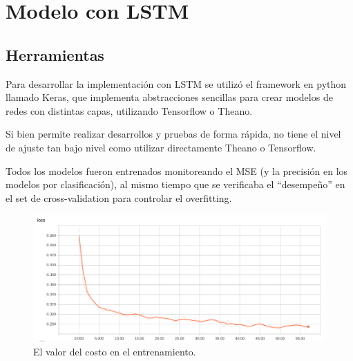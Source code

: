 
\chapter{Modelo con LSTM} %

\label{LSTM} %


\section{Herramientas}

Para desarrollar la implementaci\'on con LSTM se utiliz\'o el framework en python llamado Keras, que
implementa abstracciones sencillas para crear modelos de redes con distintas capas, utilizando
Tensorflow o Theano.

Si bien permite realizar desarrollos y pruebas de forma r\'apida, no tiene el nivel de ajuste tan
bajo nivel como utilizar directamente Theano o Tensorflow.

Todos los modelos fueron entrenados monitoreando el MSE (y la precisi\'on en los modelos por
clasificaci\'on), al mismo tiempo que se verificaba el ``desempe\~no'' en el set de cross-validation
para controlar el overfitting.

\begin{figure}[h]
    \centering
    \includegraphics[width=1\linewidth]{Figures/train_loss.png}
    \decoRule
    \caption[Train loss]{El valor del costo en el entrenamiento.}
    \label{fig:Costo durante el entrenamiento}
\end{figure}

